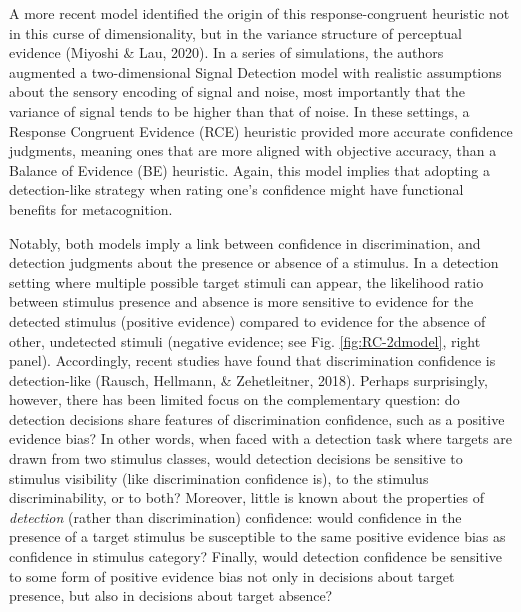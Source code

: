\documentclass[
  english,
  man]{apa6}
\begin{document}
A more recent model identified the origin of this response-congruent heuristic not in this curse of dimensionality, but in the variance structure of perceptual evidence (Miyoshi \& Lau, 2020). In a series of simulations, the authors augmented a two-dimensional Signal Detection model with realistic assumptions about the sensory encoding of signal and noise, most importantly that the variance of signal tends to be higher than that of noise. In these settings, a Response Congruent Evidence (RCE) heuristic provided more accurate confidence judgments, meaning ones that are more aligned with objective accuracy, than a Balance of Evidence (BE) heuristic. Again, this model implies that adopting a detection-like strategy when rating one's confidence might have functional benefits for metacognition.

Notably, both models imply a link between confidence in discrimination, and detection judgments about the presence or absence of a stimulus. In a detection setting where multiple possible target stimuli can appear, the likelihood ratio between stimulus presence and absence is more sensitive to evidence for the detected stimulus (positive evidence) compared to evidence for the absence of other, undetected stimuli (negative evidence; see Fig. \ref{fig:RC-2dmodel}, right panel). Accordingly, recent studies have found that discrimination confidence is detection-like (Rausch, Hellmann, \& Zehetleitner, 2018). Perhaps surprisingly, however, there has been limited focus on the complementary question: do detection decisions share features of discrimination confidence, such as a positive evidence bias? In other words, when faced with a detection task where targets are drawn from two stimulus classes, would detection decisions be sensitive to stimulus visibility (like discrimination confidence is), to the stimulus discriminability, or to both? Moreover, little is known about the properties of \emph{detection} (rather than discrimination) confidence: would confidence in the presence of a target stimulus be susceptible to the same positive evidence bias as confidence in stimulus category? Finally, would detection confidence be sensitive to some form of positive evidence bias not only in decisions about target presence, but also in decisions about target absence?
\end{document}
